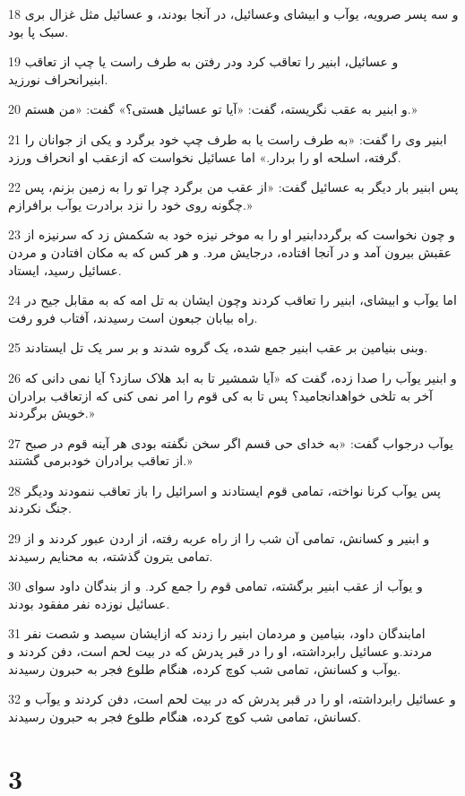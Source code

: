 \par 18 و سه پسر صرویه، یوآب و ابیشای وعسائیل، در آنجا بودند، و عسائیل مثل غزال بری سبک پا بود.
\par 19 و عسائیل، ابنیر را تعاقب کرد ودر رفتن به طرف راست یا چپ از تعاقب ابنیرانحراف نورزید.
\par 20 و ابنیر به عقب نگریسته، گفت: «آیا تو عسائیل هستی؟» گفت: «من هستم.»
\par 21 ابنیر وی را گفت: «به طرف راست یا به طرف چپ خود برگرد و یکی از جوانان را گرفته، اسلحه او را بردار.» اما عسائیل نخواست که ازعقب او انحراف ورزد.
\par 22 پس ابنیر بار دیگر به عسائیل گفت: «از عقب من برگرد چرا تو را به زمین بزنم، پس چگونه روی خود را نزد برادرت یوآب برافرازم.»
\par 23 و چون نخواست که برگرددابنیر او را به موخر نیزه خود به شکمش زد که سرنیزه از عقبش بیرون آمد و در آنجا افتاده، درجایش مرد. و هر کس که به مکان افتادن و مردن عسائیل رسید، ایستاد.
\par 24 اما یوآب و ابیشای، ابنیر را تعاقب کردند وچون ایشان به تل امه که به مقابل جیح در راه بیابان جبعون است رسیدند، آفتاب فرو رفت.
\par 25 وبنی بنیامین بر عقب ابنیر جمع شده، یک گروه شدند و بر سر یک تل ایستادند.
\par 26 و ابنیر یوآب را صدا زده، گفت که «آیا شمشیر تا به ابد هلاک سازد؟ آیا نمی دانی که آخر به تلخی خواهدانجامید؟ پس تا به کی قوم را امر نمی کنی که ازتعاقب برادران خویش برگردند.»
\par 27 یوآب درجواب گفت: «به خدای حی قسم اگر سخن نگفته بودی هر آینه قوم در صبح از تعاقب برادران خودبرمی گشتند.»
\par 28 پس یوآب کرنا نواخته، تمامی قوم ایستادند و اسرائیل را باز تعاقب ننمودند ودیگر جنگ نکردند.
\par 29 و ابنیر و کسانش، تمامی آن شب را از راه عربه رفته، از اردن عبور کردند و از تمامی یترون گذشته، به محنایم رسیدند.
\par 30 و یوآب از عقب ابنیر برگشته، تمامی قوم را جمع کرد. و از بندگان داود سوای عسائیل نوزده نفر مفقود بودند.
\par 31 امابندگان داود، بنیامین و مردمان ابنیر را زدند که ازایشان سیصد و شصت نفر مردند.و عسائیل رابرداشته، او را در قبر پدرش که در بیت لحم است، دفن کردند و یوآب و کسانش، تمامی شب کوچ کرده، هنگام طلوع فجر به حبرون رسیدند.
\par 32 و عسائیل رابرداشته، او را در قبر پدرش که در بیت لحم است، دفن کردند و یوآب و کسانش، تمامی شب کوچ کرده، هنگام طلوع فجر به حبرون رسیدند.
 
\chapter{3}

